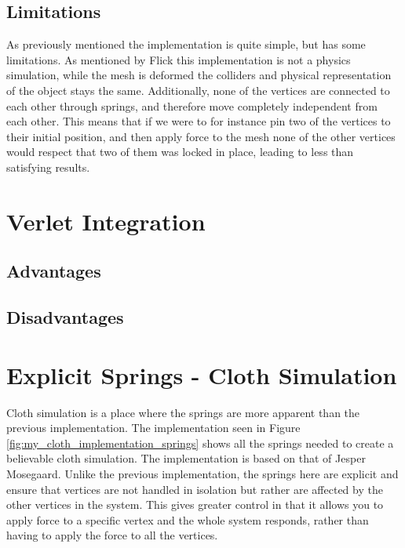 \subsection{Limitations}
As previously mentioned the implementation is quite simple, but has some limitations.
As mentioned by Flick\cite{catlike_mesh_deformation} this implementation is not a physics simulation, while the mesh is deformed
the colliders and physical representation of the object stays the same.
Additionally, none of the vertices are connected to each other through springs, and therefore move completely independent from each other.
This means that if we were to for instance pin two of the vertices to their initial position, and then apply force to the mesh
none of the other vertices would respect that two of them was locked in place, leading to less than satisfying results.

\section{Verlet Integration}
\subsection{Advantages}
\subsection{Disadvantages}

\section{Explicit Springs - Cloth Simulation}
Cloth simulation is a place where the springs are more apparent than the previous implementation.
The implementation seen in Figure \ref{fig:my_cloth_implementation_springs} shows all the springs needed to create a believable cloth simulation.
The implementation is based on that of Jesper Mosegaard\cite{mosegaards_clothing_simulation}.
Unlike the previous implementation, the springs here are explicit and ensure that vertices are not handled in isolation but rather are affected by the other vertices in the system.
This gives greater control in that it allows you to apply force to a specific vertex and the whole system responds, rather than having to apply the force to all the vertices.




